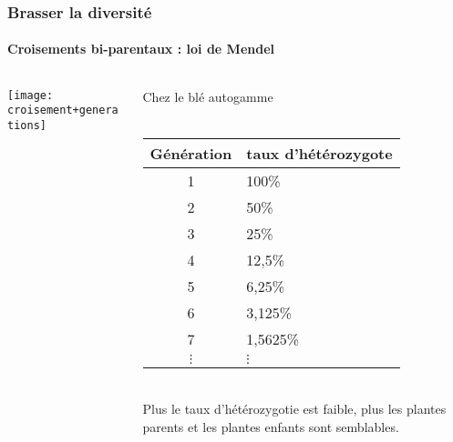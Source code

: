 \begin{frame}
\frametitle{Brasser la diversité}
\framesubtitle{Croisements bi-parentaux : loi de Mendel}

\begin{columns}

\begin{column}{.5\textwidth}

\texttt{[image: croisement+generations]}

\end{column}

\begin{column}{.5\textwidth}
Chez le blé autogamme\\

~\\

\small

\begin{tabular}{cl}
\hline
Génération & taux d'hétérozygote \\
\hline
1 & 100\% \\
2 & 50\% \\
3 & 25\% \\
4 & 12,5\% \\
5 & 6,25\% \\
6 & 3,125\% \\
7 & 1,5625\% \\
$\vdots$ & $\vdots$ \\
\hline
\end{tabular}

\normalsize

~\\

Plus le taux d'hétérozygotie est faible, plus les plantes parents et les plantes enfants sont semblables.

\end{column}

\end{columns}


\end{frame}


